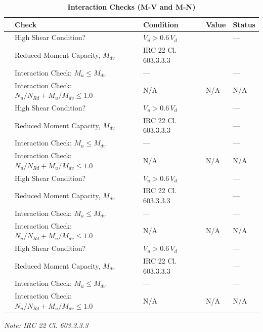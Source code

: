 \documentclass[12pt,a4paper]{report}
\numberwithin{table}{chapter}
\numberwithin{figure}{chapter}
\begin{document}
\vspace{1em}
\begin{longtable}{|C{2.5cm}|C{3.5cm}|C{3.5cm}|>{\centering\arraybackslash}p{4.2cm}|C{1.8cm}|}
\caption{\textbf{Interaction Checks (M-V and M-N)}} \\
\hline
\textbf{} & \textbf{Check} & \textbf{Condition} & \textbf{Value} & \textbf{Status} \\[6pt]
\hline
{} & High Shear Condition? & $V_u > 0.6\,V_d$ &  & --- \\[6pt]
 & Reduced Moment Capacity, $M_{dv}$ & IRC 22 Cl. 603.3.3.3 &  & --- \\[6pt]
 & Interaction Check: $M_u \leq M_{dv}$ & --- &  & --- \\[6pt]
 & Interaction Check: $N_u/N_{Rd} + M_u/M_{dv} \leq 1.0$ & N/A & N/A & N/A \\[6pt]
\hline
{} & High Shear Condition? & $V_u > 0.6\,V_d$ &  & --- \\[6pt]
 & Reduced Moment Capacity, $M_{dv}$ & IRC 22 Cl. 603.3.3.3 &  & --- \\[6pt]
 & Interaction Check: $M_u \leq M_{dv}$ & --- &  & --- \\[6pt]
 & Interaction Check: $N_u/N_{Rd} + M_u/M_{dv} \leq 1.0$ & N/A & N/A & N/A \\[6pt]
\hline
{} & High Shear Condition? & $V_u > 0.6\,V_d$ &  & --- \\[6pt]
 & Reduced Moment Capacity, $M_{dv}$ & IRC 22 Cl. 603.3.3.3 &  & --- \\[6pt]
 & Interaction Check: $M_u \leq M_{dv}$ & --- &  & --- \\[6pt]
 & Interaction Check: $N_u/N_{Rd} + M_u/M_{dv} \leq 1.0$ & N/A & N/A & N/A \\[6pt]
\hline
{} & High Shear Condition? & $V_u > 0.6\,V_d$ &  & --- \\[6pt]
 & Reduced Moment Capacity, $M_{dv}$ & IRC 22 Cl. 603.3.3.3 &  & --- \\[6pt]
 & Interaction Check: $M_u \leq M_{dv}$ & --- &  & --- \\[6pt]
 & Interaction Check: $N_u/N_{Rd} + M_u/M_{dv} \leq 1.0$ & N/A & N/A & N/A \\[6pt]
\hline
\end{longtable}
\noindent\textit{Note: IRC 22 Cl. 603.3.3.3}
\end{document}
